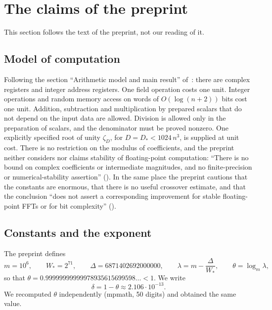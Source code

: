 \documentclass[11pt]{article}
\theoremstyle{plain}
\begin{document}
\section{The claims of the preprint}\label{sec:claims}
This section follows the text of the preprint, not our reading of it.

\subsection{Model of computation}\label{sec:model}
Following the section ``Arithmetic model and main result'' of~\citep{openai2026}: there are complex registers and integer address registers. One field operation costs one unit. Integer operations and random memory access on words of $O(\log(n+2))$ bits cost one unit. Addition, subtraction and multiplication by prepared scalars that do not depend on the input data are allowed. Division is allowed only in the preparation of scalars, and the denominator must be proved nonzero. One explicitly specified root of unity $\zeta_D$, for $D=D_*<1024\,n^3$, is supplied at unit cost. There is no restriction on the modulus of coefficients, and the preprint neither considers nor claims stability of floating-point computation: ``There is no bound on complex coefficients or intermediate magnitudes, and no finite-precision or numerical-stability assertion'' (). In the same place the preprint cautions that the constants are enormous, that there is no useful crossover estimate, and that the conclusion ``does not assert a corresponding improvement for stable floating-point FFTs or for bit complexity'' ().

\subsection{Constants and the exponent}\label{sec:constants}
The preprint defines
\begin{equation}\label{eq:constants}
m=10^6,\qquad W_*=2^{71},\qquad \Delta=6871402692000000,\qquad \lambda=m-\frac{\Delta}{W_*},\qquad \theta=\log_m\lambda,
\end{equation}
so that $\theta=0.99999999999978935615699598\ldots<1$. We write
\begin{equation}\label{eq:delta}
\delta=1-\theta\approx2.106\cdot10^{-13}.
\end{equation}
We recomputed $\theta$ independently (mpmath, 50 digits) and obtained the same value.
\end{document}
